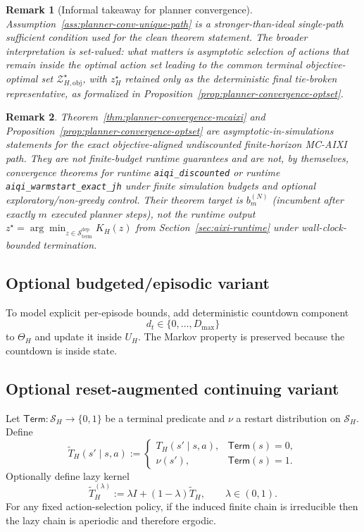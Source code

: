\documentclass[11pt]{article}
\newtheorem{remark}{Remark}
\begin{document}
\begin{remark}[Informal takeaway for planner convergence]
Assumption~\ref{ass:planner-conv-unique-path} is a stronger-than-ideal
single-path sufficient condition used for the clean theorem statement. The
broader interpretation is set-valued: what matters is asymptotic selection of
actions that remain inside the optimal action set leading to the common
terminal objective-optimal set $\mathcal{Z}_{H,\mathrm{obj}}^{\star}$, with
$z_H^{\star}$ retained only as the deterministic final tie-broken
representative, as formalized in
Proposition~\ref{prop:planner-convergence-optset}.
\end{remark}

\begin{remark}
Theorem~\ref{thm:planner-convergence-mcaixi} and
Proposition~\ref{prop:planner-convergence-optset} are asymptotic-in-simulations
statements for the exact objective-aligned undiscounted finite-horizon
MC-AIXI path. They are not finite-budget runtime guarantees and are not, by
themselves, convergence theorems for runtime \texttt{aiqi\_discounted} or
runtime \texttt{aiqi\_warmstart\_exact\allowbreak\_jh} under finite simulation budgets
and optional exploratory/non-greedy control.
Their theorem target is $b_m^{(N)}$ (incumbent after exactly $m$ executed planner
steps), not the runtime output
$z^\star=\arg\min_{z\in\mathcal{S}_{\mathrm{term}}^{\mathrm{dep}}}K_H(z)$ from
Section~\ref{sec:aixi-runtime} under wall-clock-bounded termination.
\end{remark}

\subsection{Optional budgeted/episodic variant}

To model explicit per-episode bounds, add deterministic countdown component
\[
d_t\in\{0,\dots,D_{\max}\}
\]
to $\Theta_H$ and update it inside $U_H$. The Markov property is preserved because the
countdown is inside state.

\subsection{Optional reset-augmented continuing variant}

Let $\mathsf{Term}:\mathcal{S}_H\to\{0,1\}$ be a terminal predicate and $\nu$ a
restart distribution on $\mathcal{S}_H$. Define
\[
\widetilde T_H(s'\mid s,a):=
\begin{cases}
T_H(s'\mid s,a), & \mathsf{Term}(s)=0,\\[3pt]
\nu(s'), & \mathsf{Term}(s)=1.
\end{cases}
\]
Optionally define lazy kernel
\[
\widetilde T_H^{(\lambda)}:=\lambda I+(1-\lambda)\widetilde T_H,
\qquad
\lambda\in(0,1).
\]
For any fixed action-selection policy, if the induced finite chain is
irreducible then the lazy chain is aperiodic and therefore ergodic.
\end{document}
